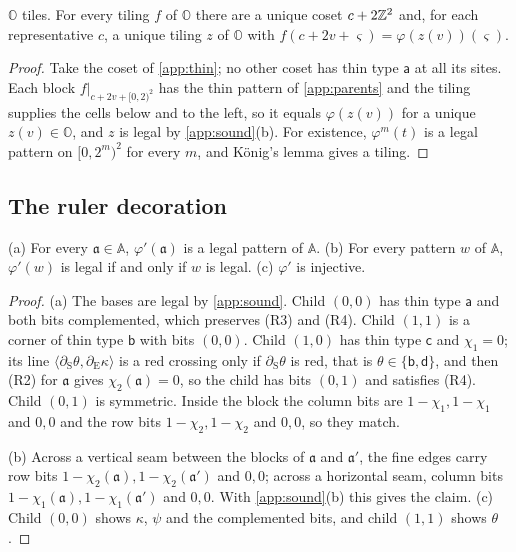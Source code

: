 \begin{proposition}\label{app:base-desub}
$\mathbb O$ tiles. For every tiling $f$ of $\mathbb O$ there are a unique coset $c+2\mathbb{Z}^2$ and, for each representative $c$, a unique tiling $z$ of $\mathbb O$ with $f(c+2v+\varsigma)=\varphi(z(v))(\varsigma)$.
\end{proposition}

\begin{proof}
Take the coset of \cref{app:thin}; no other coset has thin type $\mathsf a$ at all its sites. Each block $f|_{c+2v+[0,2)^2}$ has the thin pattern of \cref{app:parents} and the tiling supplies the cells below and to the left, so it equals $\varphi(z(v))$ for a unique $z(v)\in\mathbb O$, and $z$ is legal by \cref{app:sound}(b). For existence, $\varphi^m(t)$ is a legal pattern on $[0,2^m)^2$ for every $m$, and K\"onig's lemma gives a tiling.
\end{proof}

\subsection{The ruler decoration}

\begin{lemma}\label{app:ruler-sound}
(a) For every $\mathfrak a\in\mathbb A$, $\varphi'(\mathfrak a)$ is a legal pattern of $\mathbb A$. (b) For every pattern $w$ of $\mathbb A$, $\varphi'(w)$ is legal if and only if $w$ is legal. (c) $\varphi'$ is injective.
\end{lemma}

\begin{proof}
(a) The bases are legal by \cref{app:sound}. Child $(0,0)$ has thin type $\mathsf a$ and both bits complemented, which preserves (R3) and (R4). Child $(1,1)$ is a corner of thin type $\mathsf b$ with bits $(0,0)$. Child $(1,0)$ has thin type $\mathsf c$ and $\chi_1=0$; its line $\langle\partial_{\mathrm S}\theta,\partial_{\mathrm E}\kappa\rangle$ is a red crossing only if $\partial_{\mathrm S}\theta$ is red, that is $\theta\in\{\mathsf b,\mathsf d\}$, and then (R2) for $\mathfrak a$ gives $\chi_2(\mathfrak a)=0$, so the child has bits $(0,1)$ and satisfies (R4). Child $(0,1)$ is symmetric. Inside the block the column bits are $1-\chi_1,1-\chi_1$ and $0,0$ and the row bits $1-\chi_2,1-\chi_2$ and $0,0$, so they match.

(b) Across a vertical seam between the blocks of $\mathfrak a$ and $\mathfrak a'$, the fine edges carry row bits $1-\chi_2(\mathfrak a),1-\chi_2(\mathfrak a')$ and $0,0$; across a horizontal seam, column bits $1-\chi_1(\mathfrak a),1-\chi_1(\mathfrak a')$ and $0,0$. With \cref{app:sound}(b) this gives the claim. (c) Child $(0,0)$ shows $\kappa$, $\psi$ and the complemented bits, and child $(1,1)$ shows $\theta$.
\end{proof}

